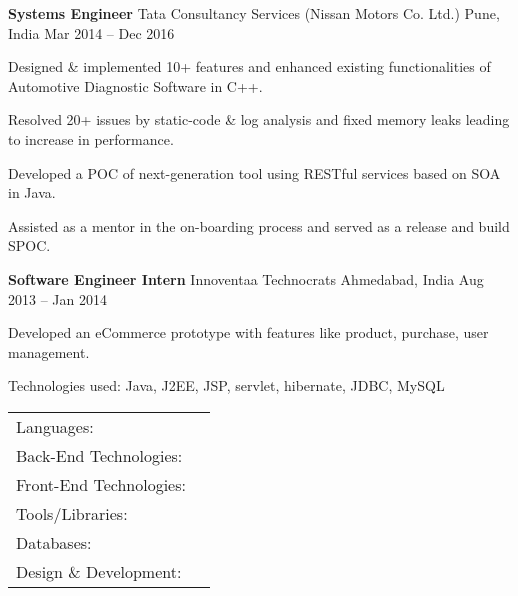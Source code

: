 \documentclass[]{awesome-cv}
\begin{document}
\vspace{-7mm}
\begin{cventries}
	\cventry
	{\textbf{Systems Engineer}}
	{Tata Consultancy Services (Nissan Motors Co. Ltd.)}
	{Pune, India}
	{Mar 2014 – Dec 2016}
	{
	\vspace{1mm}
	\begin{cvresponsiblties}
		\item {Designed \& implemented 10+ features and enhanced existing functionalities of Automotive Diagnostic Software in C++.}
		\item {Resolved 20+ issues by static-code \& log analysis and fixed memory leaks leading to increase in performance.}
		\item {Developed a POC of next-generation tool using RESTful services based on SOA in Java.}
		\item {Assisted as a mentor in the on-boarding process and served as a release and build SPOC.}
	\end{cvresponsiblties}
	\vspace{-2mm}
	}
	\cventry
	{\textbf{Software Engineer Intern}}
	{Innoventaa Technocrats}
	{Ahmedabad, India}
	{Aug 2013 – Jan 2014}
	{
	\vspace{1mm}
	\begin{cvresponsiblties}
		\item {Developed an eCommerce prototype with features like product, purchase, user management.}
		\item {Technologies used: Java, J2EE, JSP, servlet, hibernate, JDBC, MySQL}
		\end{cvresponsiblties}
	}
\end{cventries}
\vspace{-5.5mm}
\vspace{-4mm}
\begin{cventries}
	\cventry
	{}
	{\def\arraystretch{1.25}{\begin{tabular}{ l l }
	    \vspace{0.4mm}
		Languages:  & {\skill{ Java, JavaScript(ES6), C++, Python}} \\
		\vspace{0.4mm}
		Back-End Technologies:  & {\skill{ Spring, Hibernate, J2EE, flask, Node.js, RabbitMQ, MVC, AWS Lambda, Kafka, Zookeeper}} \\
		\vspace{0.4mm}
		Front-End Technologies:  & {\skill{ HTML5, CSS3, Bootstrap, AngularJS, React, Redux}} \\
		\vspace{0.4mm}
		Tools/Libraries:  & {\skill{ Git, SVN, socket.io, Maven,  eclipse, IntelliJ, JUnit, OpenCV, Docker}} \\
		\vspace{0.4mm}
		Databases:  & {\skill{ MySQL, SQLite, redis, MongoDB, cassandra, DynamoDB}} \\
		\vspace{0.4mm}
		Design \& Development:  & {\skill{ Agile, Scrum, Design Patterns, OAuth2, REST, SOAP, GraphQL}} \\
		\end{tabular}}}
	{}
	{}
	{}
\end{cventries}
\end{document}
